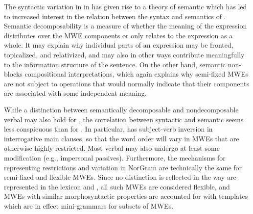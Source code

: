 \documentclass[output=paper]{langsci/langscibook}
\begin{document}
The syntactic variation in  in  has given rise to a theory of semantic  \citep{nunberg94} which has led to increased interest in the relation between the syntax and semantics of .
Semantic decomposability is a measure of whether the meaning of the expression distributes over the MWE components or only relates to the expression as a whole.
It may explain why individual parts of an expression may be fronted, topicalized, and relativized, and may also in other ways contribute meaningfully to the information structure of the sentence.
On the other hand, semantic non- blocks compositional interpretations, which again explains why semi-fixed MWEs are not subject to operations that would normally indicate that their components are associated with some independent meaning.

While a distinction between semantically decomposable and nondecomposable verbal  may also hold for , the correlation between syntactic  and semantic  seems less conspicuous than for .
In particular,  has subject-verb inversion in interrogative main clauses, so that the word order will vary in MWEs that are otherwise highly restricted. 
Most verbal  may also undergo at least some modification (e.g., impersonal passives).
Furthermore, the mechanisms for representing restrictions and variation in NorGram are technically the same for semi-fixed and flexible MWEs. 
Since no distinction is reflected in the way  are represented in the lexicon and , all such MWEs are considered flexible, 
and MWEs with similar morphosyntactic properties are accounted for with templates which are in effect mini-grammars for subsets of MWEs.
\end{document}
